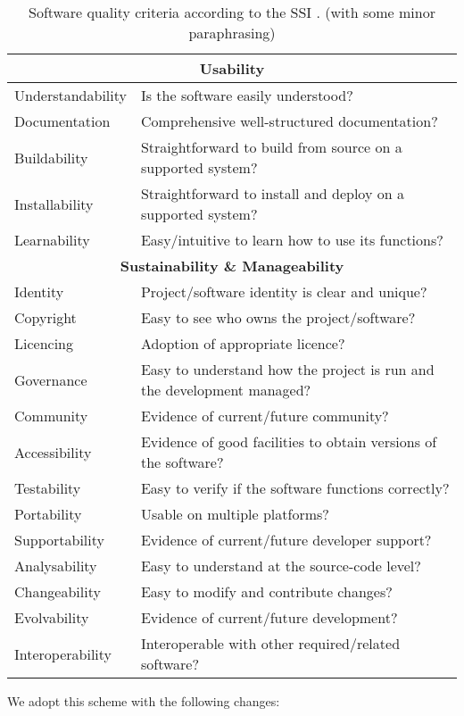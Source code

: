 \documentclass[a4paper,11pt]{article}
\begin{document}
\begin{table}[hbt]
\begin{tabular}{l|l}
\hline
\multicolumn{2}{c}{\textbf{Usability}} \\
\hline
Understandability & Is the software easily understood? \\ 
Documentation & Comprehensive well-structured documentation? \\
Buildability  & Straightforward to build from source on a supported system? \\
Installability  & Straightforward to install and deploy on a supported system? \\
Learnability & Easy/intuitive to learn how to use its functions? \\
\hline
\multicolumn{2}{c}{\textbf{Sustainability \& Manageability}} \\
\hline
Identity & Project/software identity is clear and unique? \\
Copyright & Easy to see who owns the project/software? \\
Licencing & Adoption of appropriate licence? \\
Governance & Easy to understand how the project is run and the development managed? \\
Community & Evidence of current/future community? \\
Accessibility & Evidence of good facilities to obtain versions of the software? \\
Testability & Easy to verify if the software functions correctly? \\
Portability & Usable on multiple platforms? \\
Supportability & Evidence of current/future developer support? \\
Analysability & Easy to understand at the source-code level? \\
Changeability & Easy to modify and contribute changes? \\
Evolvability & Evidence of current/future development? \\
Interoperability & Interoperable with other required/related software? \\
\end{tabular}
\caption{Software quality criteria according to the SSI \citep{SSIGUIDE}. (with some minor paraphrasing)}
\label{tab:criteria}
\end{table}

We adopt this scheme with the following changes:
\end{document}
